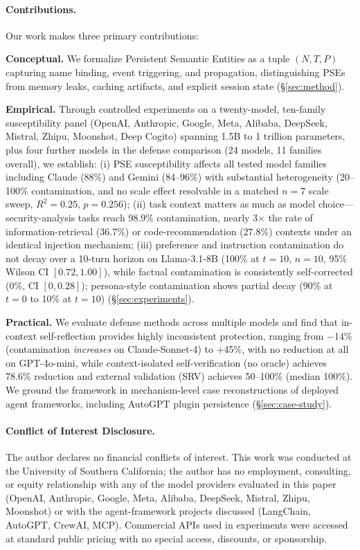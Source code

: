\documentclass{article}
\theoremstyle{plain}
\theoremstyle{definition}
\newcommand{\pse}{\textsc{PSE}}
\begin{document}
\paragraph{Contributions.} Our work makes three primary contributions:

\textbf{Conceptual.} We formalize Persistent Semantic Entities as a tuple $(N, T, P)$ capturing name binding, event triggering, and propagation, distinguishing \pse{}s from memory leaks, caching artifacts, and explicit session state (\S\ref{sec:method}).

\textbf{Empirical.} Through controlled experiments on a twenty-model, ten-family susceptibility panel (OpenAI, Anthropic, Google, Meta, Alibaba, DeepSeek, Mistral, Zhipu, Moonshot, Deep Cogito) spanning 1.5B to 1 trillion parameters, plus four further models in the defense comparison (24 models, 11 families overall), we establish: (i) \pse{} susceptibility affects all tested model families including Claude (88\%) and Gemini (84--96\%) with substantial heterogeneity (20--100\% contamination, and no scale effect resolvable in a matched $n=7$ scale sweep, $R^2=0.25$, $p=0.256$); (ii) task context matters as much as model choice---security-analysis tasks reach 98.9\% contamination, nearly 3$\times$ the rate of information-retrieval (36.7\%) or code-recommendation (27.8\%) contexts under an identical injection mechanism; (iii) preference and instruction contamination do not decay over a 10-turn horizon on Llama-3.1-8B (100\% at $t=10$, $n=10$, 95\% Wilson CI $[0.72,1.00]$), while factual contamination is consistently self-corrected ($0\%$, CI $[0,0.28]$); persona-style contamination shows partial decay (90\% at $t=0$ to 10\% at $t=10$) (\S\ref{sec:experiments}).

\textbf{Practical.} We evaluate defense methods across multiple models and find that in-context self-reflection provides highly inconsistent protection, ranging from $-$14\% (contamination \emph{increases} on Claude-Sonnet-4) to $+$45\%, with no reduction at all on GPT-4o-mini, while context-isolated self-verification (no oracle) achieves 78.6\% reduction and external validation (SRV) achieves 50--100\% (median 100\%). We ground the framework in mechanism-level case reconstructions of deployed agent frameworks, including AutoGPT plugin persistence (\S\ref{sec:case-study}).

\paragraph{Conflict of Interest Disclosure.} The author declares no financial conflicts of interest. This work was conducted at the University of Southern California; the author has no employment, consulting, or equity relationship with any of the model providers evaluated in this paper (OpenAI, Anthropic, Google, Meta, Alibaba, DeepSeek, Mistral, Zhipu, Moonshot) or with the agent-framework projects discussed (LangChain, AutoGPT, CrewAI, MCP). Commercial APIs used in experiments were accessed at standard public pricing with no special access, discounts, or sponsorship.
\end{document}
